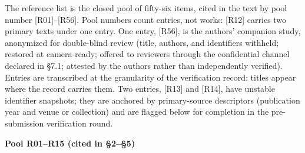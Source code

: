 \documentclass[11pt,a4paper]{article}
\begin{document}
The reference list is the closed pool of fifty-six items, cited in the text by pool number [R01]–[R56]. Pool numbers count entries, not works: [R12] carries two primary texts under one entry. One entry, [R56], is the authors' companion study, anonymized for double-blind review (title, authors, and identifiers withheld; restored at camera-ready; offered to reviewers through the confidential channel declared in §7.1; attested by the authors rather than independently verified). Entries are transcribed at the granularity of the verification record: titles appear where the record carries them. Two entries, [R13] and [R14], have unstable identifier snapshots; they are anchored by primary-source descriptors (publication year and venue or collection) and are flagged below for completion in the pre-submission verification round.

\medskip
\noindent\textbf{Pool R01–R15 (cited in §2–§5)}\par\addvspace{2pt}
\end{document}
